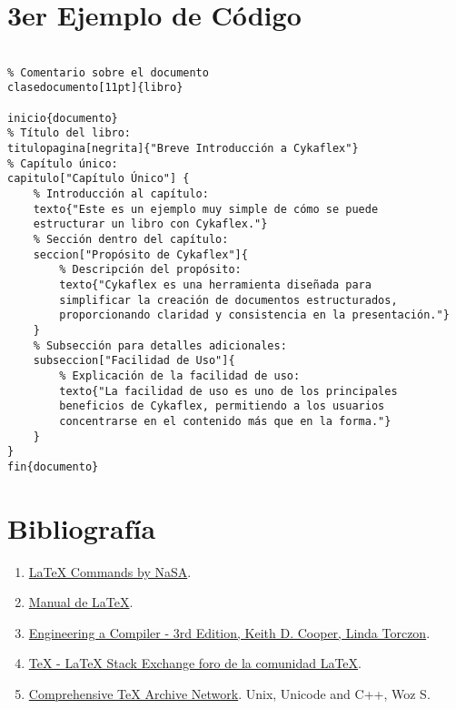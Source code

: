 \documentclass[12pt]{article}
\begin{document}
\section{3er Ejemplo de Código}
        \begin{center}
        \begin{verbatim}
        
% Comentario sobre el documento
clasedocumento[11pt]{libro}

inicio{documento}
% Título del libro:
titulopagina[negrita]{"Breve Introducción a Cykaflex"}
% Capítulo único:
capitulo["Capítulo Único"] {
    % Introducción al capítulo:
    texto{"Este es un ejemplo muy simple de cómo se puede 
    estructurar un libro con Cykaflex."}
    % Sección dentro del capítulo:
    seccion["Propósito de Cykaflex"]{
        % Descripción del propósito:
        texto{"Cykaflex es una herramienta diseñada para 
        simplificar la creación de documentos estructurados, 
        proporcionando claridad y consistencia en la presentación."}
    }
    % Subsección para detalles adicionales:
    subseccion["Facilidad de Uso"]{
        % Explicación de la facilidad de uso:
        texto{"La facilidad de uso es uno de los principales 
        beneficios de Cykaflex, permitiendo a los usuarios 
        concentrarse en el contenido más que en la forma."}
    }
}
fin{documento}
        \end{verbatim}
        \end{center}
\section{Bibliografía}
\begin{enumerate}
    \item \href{https://www.giss.nasa.gov/tools/latex/ltx-2.html}{LaTeX Commands by NaSA}.
    \item \href{https://manualdelatex.com/simbolos#chapter10}{Manual de LaTeX}.
    \item \href{https://shop.elsevier.com/books/engineering-a-compiler/cooper/978-0-12-815412-0}{Engineering a Compiler - 3rd Edition, Keith D. Cooper, Linda Torczon}.
    \item \href{https://tex.stackexchange.com/}{TeX - LaTeX Stack Exchange foro de la comunidad LaTeX}.
    \item \href{https://ctan.org/}{Comprehensive TeX Archive Network}.
\newpage
Unix, Unicode and C++, Woz S.
\end{enumerate}
\end{document}
